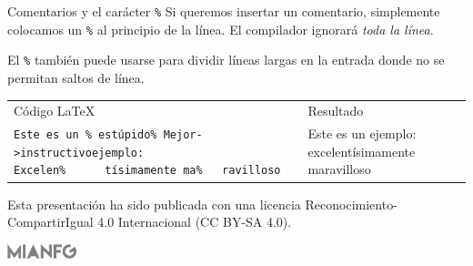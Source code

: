 \documentclass[10pt, xcolor=table]{beamer}
\begin{document}
\begin{frame}{Comentarios y el carácter \texttt{\%}}
	Si queremos insertar un comentario, simplemente colocamos un \texttt{\%} al principio de la línea. El compilador ignorará \emph{toda la línea}.
	
	El \texttt{\%} también puede usarse para dividir líneas largas en la entrada donde no se permitan saltos de línea.
	
	\begin{table}[H]
		\begin{tabular}{ L{4cm} L{0.5cm} L{4cm} }
			\alert{Código \LaTeX{}}                                                                                                                                                                                            & \hspace{1cm} & \alert{Resultado}                                                               \\
			\texttt{Este es un \% estúpido}\newline\texttt{\% Mejor->instructivo}\newline\texttt{ejemplo: Excelen\%}\newline\texttt{\ \ \ \ \ \ tísimamente ma\%}\newline\texttt{\ \ \ ravilloso} &              & Este es un ejemplo: excelentísimamente maravilloso \\
		\end{tabular}
	\end{table}
	
\end{frame}

\vspace*{2cm}
Esta presentación ha sido publicada con una licencia Reconocimiento-CompartirIgual 4.0 Internacional (CC BY-SA 4.0).

\begin{center}\ccbysa\end{center}
 
\vspace*{2cm}
\begin{flushright}
	\includegraphics[width=2cm]{../assets/mianfg-logo-grey.png}
\end{flushright}

\section*{}
\end{document}
